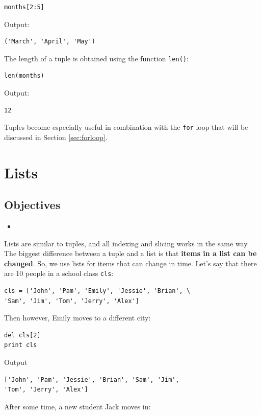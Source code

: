 \documentclass[article,A4,12pt]{llncs}
\begin{document}
\begin{verbatim}
months[2:5]
\end{verbatim}
Output:

\begin{verbatim}
('March', 'April', 'May')
\end{verbatim}
The length of a tuple is obtained using the function {\tt len()}:

\begin{verbatim}
len(months)
\end{verbatim}
Output:

\begin{verbatim}
12
\end{verbatim}
Tuples become especially useful in combination with the {\tt for}
loop that will be discussed in Section \ref{sec:forloop}. 

\section{Lists}

\subsection{Objectives}

\begin{itemize}
\item
\end{itemize}

\noindent
Lists are similar to tuples, and all indexing and slicing works in the same way. 
The biggest difference between a tuple 
and a list is that {\bf items in a list can be changed}. So, we use
lists for items that can change in time. Let's say that there are 
10 people in a school class {\tt cls}:

\begin{verbatim}
cls = ['John', 'Pam', 'Emily', 'Jessie', 'Brian', \
'Sam', 'Jim', 'Tom', 'Jerry', 'Alex']
\end{verbatim}
Then however, Emily moves to a different city:

\begin{verbatim}
del cls[2]
print cls
\end{verbatim}
Output

\begin{verbatim}
['John', 'Pam', 'Jessie', 'Brian', 'Sam', 'Jim', 
'Tom', 'Jerry', 'Alex']
\end{verbatim}
After some time, a new student Jack moves in:
\end{document}

